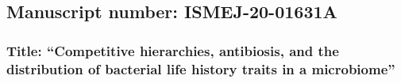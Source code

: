 \documentclass[11pt,]{article}
\author{}
\date{}
\begin{document}
%




\vskip -8.5pt



\noindent \singlespacing

\hypertarget{manuscript-number-ismej-20-01631a}{%
\subsection{Manuscript number:
ISMEJ-20-01631A}\label{manuscript-number-ismej-20-01631a}}

\hypertarget{title-competitive-hierarchies-antibiosis-and-the-distribution-of-bacterial-life-history-traits-in-a-microbiome}{%
\subsubsection{Title: ``Competitive hierarchies, antibiosis, and the
distribution of bacterial life history traits in a
microbiome''}\label{title-competitive-hierarchies-antibiosis-and-the-distribution-of-bacterial-life-history-traits-in-a-microbiome}}
\end{document}
